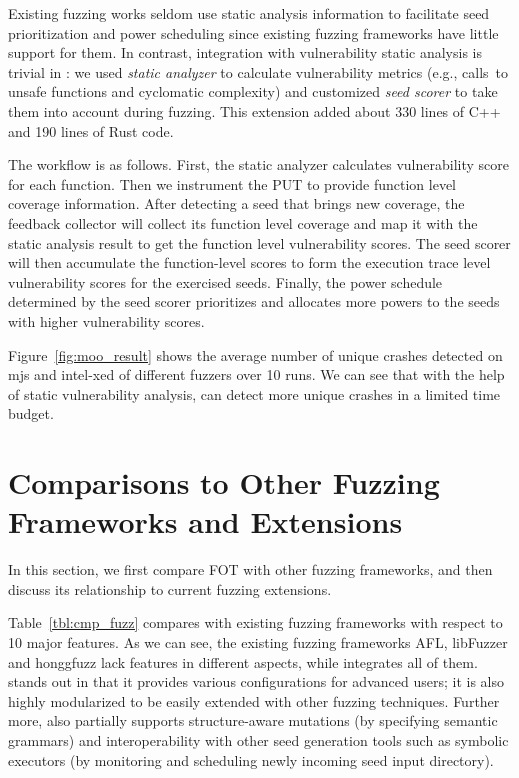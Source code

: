 Existing fuzzing works seldom use static analysis information to facilitate seed prioritization and power scheduling since existing fuzzing frameworks have little support for them.
In contrast, integration with vulnerability static analysis is trivial in \FOT: we used \emph{static analyzer} to calculate vulnerability metrics (e.g., calls~to unsafe functions and cyclomatic complexity) and customized \emph{seed scorer} to take them into account during fuzzing. This extension added about 330 lines of C++ and 190 lines of Rust code.

The workflow is as follows.
First, the static analyzer calculates vulnerability score for each function. Then we instrument the PUT to provide function level coverage information.
After detecting a seed that brings new coverage, the feedback collector will collect its function level coverage and map it with the static analysis result to get the function level vulnerability scores.
The seed scorer will then accumulate the function-level scores to form the execution trace level vulnerability scores for the exercised seeds.
Finally, the power schedule determined by the seed scorer prioritizes and allocates more powers to the seeds with higher vulnerability scores.



Figure~\ref{fig:moo_result} shows the average number of unique crashes detected on mjs and intel-xed of different fuzzers over 10 runs.
We can see that with the help of static vulnerability analysis, {\FOT} can detect more unique crashes in a limited time budget.

  

\section{Comparisons to Other Fuzzing Frameworks and Extensions}


In this section, we first compare FOT with other fuzzing frameworks, and then discuss its relationship to current fuzzing extensions.



Table~\ref{tbl:cmp_fuzz} compares {\FOT} with existing fuzzing frameworks with respect to 10 major features. As we can see, the existing fuzzing frameworks AFL, libFuzzer and honggfuzz lack features in different aspects, while {\FOT} integrates all of them. {\FOT} stands out in that it provides various configurations for advanced users; it is also highly modularized to be easily extended with other fuzzing techniques. Further more, {\FOT} also partially supports structure-aware mutations (by specifying semantic grammars) and interoperability with other seed generation tools such as symbolic executors (by monitoring and scheduling newly incoming seed input directory).

